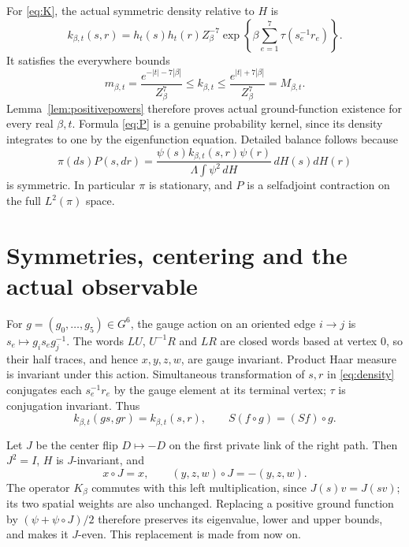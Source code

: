 \documentclass[11pt]{article}
\begin{document}
For \eqref{eq:K}, the actual symmetric density relative to $H$ is
\begin{equation}\label{eq:density}
 k_{\beta,t}(s,r)=h_t(s)h_t(r)
 Z_\beta^{-7}\exp\!\left\{\beta\sum_{e=1}^7\tau(s_e^{-1}r_e)\right\}.
\end{equation}
It satisfies the everywhere bounds
\begin{equation}\label{eq:kernelbounds}
 m_{\beta,t}=\frac{e^{-|t|-7|\beta|}}{Z_\beta^7}
 \leq k_{\beta,t}\leq
 \frac{e^{|t|+7|\beta|}}{Z_\beta^7}=M_{\beta,t}.
\end{equation}
Lemma~\ref{lem:positivepowers} therefore proves actual ground-function
existence for every real $\beta,t$. Formula \eqref{eq:P} is a genuine
probability kernel, since its density integrates to one by the
eigenfunction equation. Detailed balance follows because
\[
 \pi(ds)P(s,dr)=
 \frac{\psi(s)k_{\beta,t}(s,r)\psi(r)}
      {\Lambda\int\psi^2\,dH}\,dH(s)dH(r)
\]
is symmetric. In particular $\pi$ is stationary, and $P$ is a
selfadjoint contraction on the full $L^2(\pi)$ space.

\section{Symmetries, centering and the actual observable}
For $g=(g_0,\ldots,g_5)\in G^6$, the gauge action on an oriented edge
$i\to j$ is $s_e\mapsto g_i s_e g_j^{-1}$. The words $LU$, $U^{-1}R$
and $LR$ are closed words based at vertex $0$, so their half traces,
and hence $x,y,z,w$, are gauge invariant. Product Haar measure is
invariant under this action. Simultaneous transformation of $s,r$ in
\eqref{eq:density} conjugates each $s_e^{-1}r_e$ by the gauge element
at its terminal vertex; $\tau$ is conjugation invariant. Thus
\begin{equation}\label{eq:gaugecovariance}
 k_{\beta,t}(gs,gr)=k_{\beta,t}(s,r),\qquad
 S(f\circ g)=(Sf)\circ g.
\end{equation}

Let $J$ be the center flip $D\mapsto-D$ on the first private link of
the right path. Then $J^2=I$, $H$ is $J$-invariant, and
\[
 x\circ J=x,\qquad (y,z,w)\circ J=-(y,z,w).
\]
The operator $K_\beta$ commutes with this left multiplication, since
$J(s)v=J(sv)$; its two spatial weights are also unchanged.
Replacing a positive ground function by $(\psi+\psi\circ J)/2$
therefore preserves its eigenvalue, lower and upper bounds, and makes
it $J$-even. This replacement is made from now on.
\end{document}
